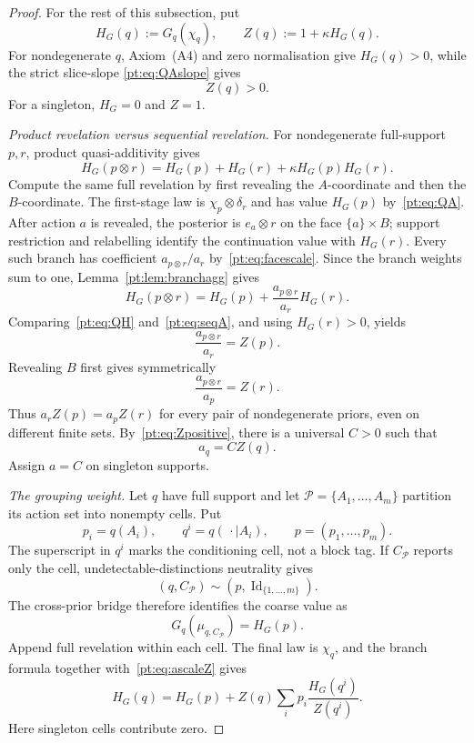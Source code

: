 \documentclass[11pt,a4paper]{article}
\theoremstyle{definition}
\newcommand{\Id}{\operatorname{Id}}
\newcommand{\1}{\mathbf 1}
\begin{document}
\begin{proof}
For the rest of this subsection, put
\[
 H_G(q):=G_q(\chi_q),\qquad Z(q):=1+\kappa H_G(q).
\]
For nondegenerate $q$, Axiom~\textup{(A4)} and zero normalisation give
$H_G(q)>0$, while the strict slice-slope
\eqref{pt:eq:QAslope} gives
\begin{equation}
 Z(q)>0.
\label{pt:eq:Zpositive}
\end{equation}
For a singleton, $H_G=0$ and $Z=1$.

\emph{Product revelation versus sequential revelation.}
For nondegenerate full-support $p,r$, product quasi-additivity gives
\begin{equation}
 H_G(p\otimes r)
 =H_G(p)+H_G(r)+\kappa H_G(p)H_G(r).
\tag{QH}\label{pt:eq:QH}
\end{equation}
Compute the same full revelation by first revealing the $A$-coordinate and
then the $B$-coordinate.  The first-stage law is
$\chi_p\otimes\delta_r$ and has value $H_G(p)$ by~\eqref{pt:eq:QA}.
After action $a$ is revealed, the posterior is $e_a\otimes r$ on the face
$\{a\}\times B$; support restriction and relabelling identify the
continuation value with $H_G(r)$.  Every such branch has coefficient
$a_{p\otimes r}/a_r$ by~\eqref{pt:eq:facescale}.  Since the branch weights
sum to one, Lemma~\ref{pt:lem:branchagg} gives
\begin{equation}
 H_G(p\otimes r)=H_G(p)+\frac{a_{p\otimes r}}{a_r}H_G(r).
\tag{SA}\label{pt:eq:seqA}
\end{equation}
Comparing~\eqref{pt:eq:QH} and~\eqref{pt:eq:seqA}, and using
$H_G(r)>0$, yields
\[
 \frac{a_{p\otimes r}}{a_r}=Z(p).
\tag{R1}\label{pt:eq:ratio1}
\]
Revealing $B$ first gives symmetrically
\[
 \frac{a_{p\otimes r}}{a_p}=Z(r).
\tag{R2}\label{pt:eq:ratio2}
\]
Thus $a_rZ(p)=a_pZ(r)$ for every pair of nondegenerate priors, even on
different finite sets.  By~\eqref{pt:eq:Zpositive}, there is a universal
$C>0$ such that
\begin{equation}
 a_q=CZ(q).
\tag{AS}\label{pt:eq:ascaleZ}
\end{equation}
Assign $a=C$ on singleton supports.

\emph{The grouping weight.}
Let $q$ have full support and let
$\mathcal P=\{A_1,\ldots,A_m\}$ partition its action set into nonempty
cells.  Put
\[
 p_i=q(A_i),\qquad q^i=q(\,\cdot\mid A_i),\qquad
 p=(p_1,\ldots,p_m).
\]
The superscript in $q^i$ marks the conditioning cell, not a block tag.
If $C_{\mathcal P}$ reports only the cell, undetectable-distinctions
neutrality gives
\[
 (q,C_{\mathcal P})\sim(p,\Id_{\{1,\ldots,m\}}).
\]
The cross-prior bridge therefore identifies the coarse value as
\begin{equation}
 G_q(\mu_{q,C_{\mathcal P}})=H_G(p).
\tag{BG}\label{pt:eq:blockvalue}
\end{equation}
Append full revelation within each cell.  The final law is $\chi_q$, and the
branch formula together with~\eqref{pt:eq:ascaleZ} gives
\begin{equation}
 H_G(q)=H_G(p)+Z(q)\sum_i p_i\frac{H_G(q^i)}{Z(q^i)}.
\tag{GR}\label{pt:eq:groupingH}
\end{equation}
Here singleton cells contribute zero.


\end{proof}
\end{document}
